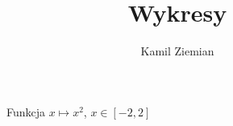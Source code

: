 \documentclass[a4paper,11pt]{article}
\title{Wykresy}
\author{Kamil Ziemian \\
  \email}
\numberwithin{equation}{section}
\begin{document}





\maketitle












\begin{figure}

  \label{fig:squaf-of-x-function-01}


  \centering

  \begin{tikzpicture}


  \end{tikzpicture}

  \caption{Funkcja $x \mapsto x^{ 2 }$, $x \in [ -2, 2 ]$}


\end{figure}















\end{document}
